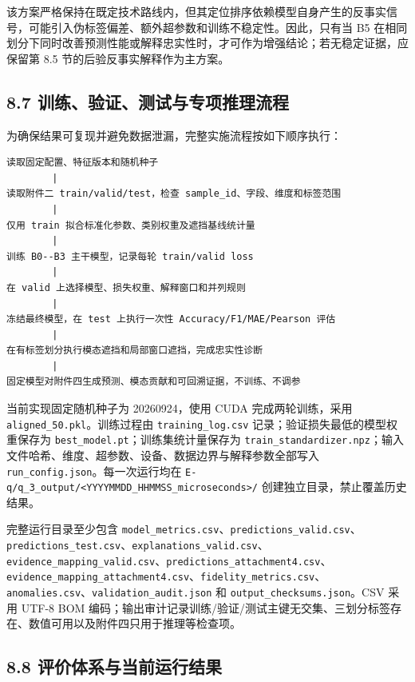 \documentclass[
  12pt,
  a4paper,
]{ctexart}
\begin{document}
该方案严格保持在既定技术路线内，但其定位排序依赖模型自身产生的反事实信号，可能引入伪标签偏差、额外超参数和训练不稳定性。因此，只有当
B5
在相同划分下同时改善预测性能或解释忠实性时，才可作为增强结论；若无稳定证据，应保留第
8.5 节的后验反事实解释作为主方案。

\hypertarget{ux8badux7ec3ux9a8cux8bc1ux6d4bux8bd5ux4e0eux4e13ux9879ux63a8ux7406ux6d41ux7a0b}{%
\subsection{8.7
训练、验证、测试与专项推理流程}\label{ux8badux7ec3ux9a8cux8bc1ux6d4bux8bd5ux4e0eux4e13ux9879ux63a8ux7406ux6d41ux7a0b}}

为确保结果可复现并避免数据泄漏，完整实施流程按如下顺序执行：

\begin{verbatim}
读取固定配置、特征版本和随机种子
        |
读取附件二 train/valid/test，检查 sample_id、字段、维度和标签范围
        |
仅用 train 拟合标准化参数、类别权重及遮挡基线统计量
        |
训练 B0--B3 主干模型，记录每轮 train/valid loss
        |
在 valid 上选择模型、损失权重、解释窗口和并列规则
        |
冻结最终模型，在 test 上执行一次性 Accuracy/F1/MAE/Pearson 评估
        |
在有标签划分执行模态遮挡和局部窗口遮挡，完成忠实性诊断
        |
固定模型对附件四生成预测、模态贡献和可回溯证据，不训练、不调参
\end{verbatim}

当前实现固定随机种子为 20260924，使用 CUDA 完成两轮训练，采用
\texttt{aligned\_50.pkl}。训练过程由 \texttt{training\_log.csv}
记录；验证损失最低的模型权重保存为
\texttt{best\_model.pt}；训练集统计量保存为
\texttt{train\_standardizer.npz}；输入文件哈希、维度、超参数、设备、数据边界与解释参数全部写入
\texttt{run\_config.json}。每一次运行均在
\texttt{E-q/q\_3\_output/\textless{}YYYYMMDD\_HHMMSS\_microseconds\textgreater{}/}
创建独立目录，禁止覆盖历史结果。

完整运行目录至少包含
\texttt{model\_metrics.csv}、\texttt{predictions\_valid.csv}、\texttt{predictions\_test.csv}、\texttt{explanations\_valid.csv}、\texttt{evidence\_mapping\_valid.csv}、\texttt{predictions\_attachment4.csv}、\texttt{evidence\_mapping\_attachment4.csv}、\texttt{fidelity\_metrics.csv}、\texttt{anomalies.csv}、\texttt{validation\_audit.json}
和 \texttt{output\_checksums.json}。CSV 采用 UTF-8 BOM
编码；输出审计记录训练/验证/测试主键无交集、三划分标签存在、数值可用以及附件四只用于推理等检查项。

\hypertarget{ux8bc4ux4ef7ux4f53ux7cfbux4e0eux5f53ux524dux8fd0ux884cux7ed3ux679c}{%
\subsection{8.8
评价体系与当前运行结果}\label{ux8bc4ux4ef7ux4f53ux7cfbux4e0eux5f53ux524dux8fd0ux884cux7ed3ux679c}}
\end{document}
